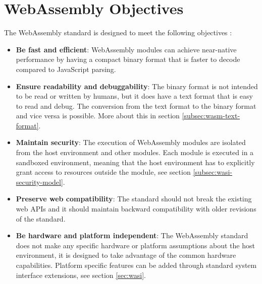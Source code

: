 \section{WebAssembly Objectives}
\label{sec:wasm-objectives}

The WebAssembly standard is designed to meet the following objectives \cite{mozillacorporation_2023_webassembly}:
\begin{itemize}
  \item \textbf{Be fast and efficient}: WebAssembly modules can achieve near-native performance by having a compact binary format that is faster to decode compared to JavaScript parsing.
  \item \textbf{Ensure readability and debuggability}: The binary format is not intended to be read or written by humans, but it does have a text format that is easy to read and debug. The conversion from the text format to the binary format and vice versa is possible. More about this in section \ref{subsec:wasm-text-format}.
  \item \textbf{Maintain security}: The execution of WebAssembly modules are isolated from the host environment and other modules. Each module is executed in a sandboxed environment, meaning that the host environment has to explicitly grant access to resources outside the module, see section \ref{subsec:wasi-security-model}. 
  \item \textbf{Preserve web compatibility}: The standard should not break the existing web APIs and it should maintain backward compatibility with older revisions of the standard.
  \item \textbf{Be hardware and platform independent}: The WebAssembly standard does not make any specific hardware or platform assumptions about the host environment, it is designed to take advantage of the common hardware capabilities. Platform specific features can be added through standard system interface extensions, see section \ref{sec:wasi}.
\end{itemize}